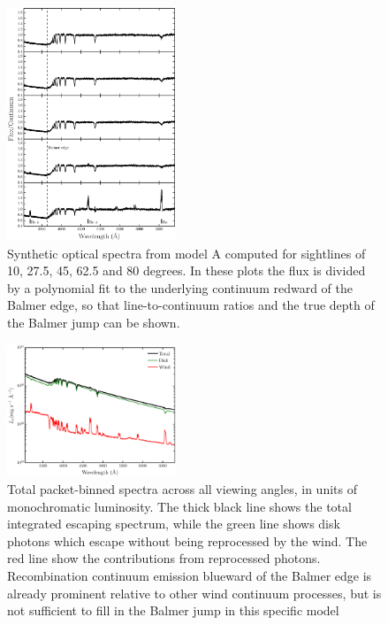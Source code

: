 \documentclass[preprint, a4paper, 11pt]{aastex}
\begin{document}
\begin{figure} 
\includegraphics[width=0.45\textwidth]{figures/modela_opt_cont.eps}
\caption{Synthetic optical spectra from model A computed for 
sightlines of 10, 27.5, 45, 62.5 and 80 degrees. In these plots
the flux is divided by a polynomial fit to the 
underlying continuum redward of the Balmer edge, so that 
line-to-continuum ratios and the true depth of the
Balmer jump can be shown.}
\label{spec_continuum}
\end{figure} 

\begin{figure} 
\includegraphics[width=0.45\textwidth]{figures/modela_escaping.eps}
\caption{Total packet-binned spectra across all viewing angles, in units
of monochromatic luminosity.
The thick black line shows the total 
integrated escaping spectrum, 
while the green line shows disk photons which escape without being reprocessed by
the wind. The red line show the contributions from reprocessed photons. 
Recombination continuum emission blueward of the Balmer 
edge is already prominent relative to other wind continuum processes, but is not sufficient
to fill in the Balmer jump in this specific model}
\label{cont}
\end{figure} 


\newpage
\end{document}
